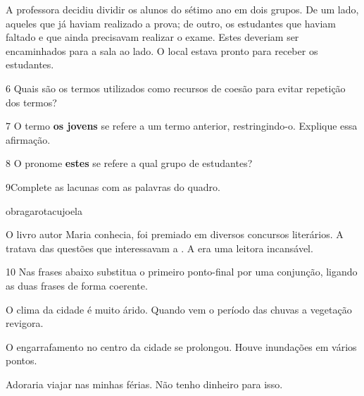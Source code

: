 \begin{myquote}

A professora decidiu dividir os alunos do sétimo ano em dois grupos. De um
lado, aqueles que já haviam realizado a prova; de outro, os estudantes que
haviam faltado e que ainda precisavam realizar o exame. Estes deveriam
ser encaminhados para a sala ao lado. O local estava pronto para receber
os estudantes.

\end{myquote}

\num{6} Quais são os termos utilizados como recursos de coesão para
evitar repetição dos termos? 


\num{7} O termo \textbf{os jovens} se refere a um termo anterior, restringindo-o. 
Explique essa afirmação.


\num{8} O pronome \textbf{estes} se refere a qual grupo de estudantes?


\num{9}Complete as lacunas com as palavras do quadro.

\begin{myquote}

obra\hfill garota\hfill cujo\hfill ela\hfill

\end{myquote}

\bigskip
O livro  autor Maria conhecia, foi premiado em diversos
concursos literários. A  tratava das questões que interessavam
a . A  era uma leitora incansável.
\bigskip

\num{10} Nas frases abaixo substitua o primeiro ponto-final por uma conjunção,
ligando as duas frases de forma coerente. 

\begin{escolha}

  \item O clima da cidade é muito árido. Quando vem o período das chuvas a
  vegetação revigora.\\
  
  \item O engarrafamento no centro da cidade se prolongou. Houve inundações em
  vários pontos.\\
  
  \item Adoraria viajar nas minhas férias. Não tenho dinheiro para isso.\\

\end{escolha}

